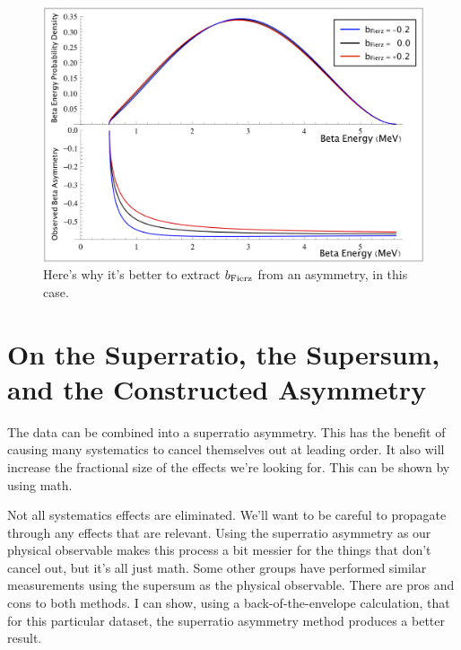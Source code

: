 
\begin{figure}[h!!t]
	\centering
	\includegraphics[width=.999\linewidth]
	{Figures/Fierz_Signature.png}
	\caption{Here's why it's better to extract $b_{\mathrm{Fierz}}$ from an asymmetry, in this case.}	
	\label{fig:FierzSignature}
\end{figure}


\section{On the Superratio, the Supersum, and the Constructed Asymmetry}

The data can be combined into a superratio asymmetry.  This has the benefit of causing many systematics to cancel themselves out at leading order.  It also will increase the fractional size of the effects we're looking for.  This can be shown by using math.  

Not all systematics effects are eliminated.  We'll want to be careful to propagate through any effects that are relevant.  Using the superratio asymmetry as our physical observable makes this process a bit messier for the things that don't cancel out, but it's all just math.  
Some other groups have performed similar measurements using the supersum as the physical observable.  There are pros and cons to both methods.  I can show, using a back-of-the-envelope calculation, that for this particular dataset, the superratio asymmetry method produces a better result.  



